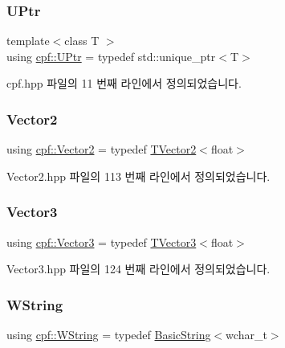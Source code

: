 \mbox{\label{namespacecpf_ae8ac5e55927cc357960f1d47c19fe0b9}} 
\subsubsection{\texorpdfstring{U\+Ptr}{UPtr}}
{\footnotesize\ttfamily template$<$class T $>$ \\
using \hyperlink{namespacecpf_ae8ac5e55927cc357960f1d47c19fe0b9}{cpf\+::\+U\+Ptr} = typedef std\+::unique\+\_\+ptr$<$T$>$}



cpf.\+hpp 파일의 11 번째 라인에서 정의되었습니다.

\mbox{\label{namespacecpf_a53b08b8672bd40979ad59ad208cc9970}} 
\subsubsection{\texorpdfstring{Vector2}{Vector2}}
{\footnotesize\ttfamily using \hyperlink{namespacecpf_a53b08b8672bd40979ad59ad208cc9970}{cpf\+::\+Vector2} = typedef \hyperlink{classcpf_1_1_t_vector2}{T\+Vector2}$<$float$>$}



Vector2.\+hpp 파일의 113 번째 라인에서 정의되었습니다.

\mbox{\label{namespacecpf_a50675f369f5384c7543c7672e3441ba0}} 
\subsubsection{\texorpdfstring{Vector3}{Vector3}}
{\footnotesize\ttfamily using \hyperlink{namespacecpf_a50675f369f5384c7543c7672e3441ba0}{cpf\+::\+Vector3} = typedef \hyperlink{classcpf_1_1_t_vector3}{T\+Vector3}$<$float$>$}



Vector3.\+hpp 파일의 124 번째 라인에서 정의되었습니다.

\mbox{\label{namespacecpf_ad36115a5fb55fb1cc257eeab6aed2d7a}} 
\subsubsection{\texorpdfstring{W\+String}{WString}}
{\footnotesize\ttfamily using \hyperlink{namespacecpf_ad36115a5fb55fb1cc257eeab6aed2d7a}{cpf\+::\+W\+String} = typedef \hyperlink{namespacecpf_ac91c8c57a370a5bef21ac23f876ad536}{Basic\+String}$<$wchar\+\_\+t$>$}



